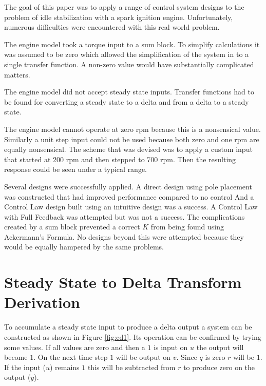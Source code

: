 \documentclass{article}
\begin{document}
The goal of this paper was to apply a range of control system
designs to the problem of idle stabilization with a spark ignition
engine.
Unfortunately, numerous difficulties were encountered with this
real world problem.

The engine model took a torque input to a sum block.
To simplify calculations it was assumed to be zero which allowed
the simplification of the system in to a single transfer function.
A non-zero value would have substantially complicated matters.

The engine model did not accept steady state inputs.
Transfer functions had to be found for converting a steady state to a
delta and from a delta to a steady state.

The engine model cannot operate at zero rpm because this is a
nonsensical value.
Similarly a unit step input could not be used because both zero
and one rpm are equally nonsensical.
The scheme that was devised was to apply a custom input that started
at 200 rpm and then stepped to 700 rpm.
Then the resulting response could be seen under a typical range.

Several designs were successfully applied.
A direct design using pole placement was constructed that had improved
performance compared to no control
And a Control Law design built using an intuitive design was a success.
A Control Law with Full Feedback was attempted but was not a success.
The complications created by a sum block prevented a correct $K$
from being found using Ackermann's Formula.
No designs beyond this were attempted because they would be equally
hampered by the same problems.


\clearpage
\appendix

\clearpage
\section{Steady State to Delta Transform Derivation}
\label{app:cdelta}

To accumulate a steady state input to produce a delta output
a system can be constructed as shown in Figure \ref{fig:cd1}.
Its operation can be confirmed by trying some values.
If all values are zero and then a $1$ is input on $u$ the
output will become $1$.
On the next time step $1$ will be output on $v$.
Since $q$ is zero $r$ will be $1$.
If the input ($u$) remains $1$ this will be subtracted from $r$
to produce zero on the output ($y$).
\end{document}
